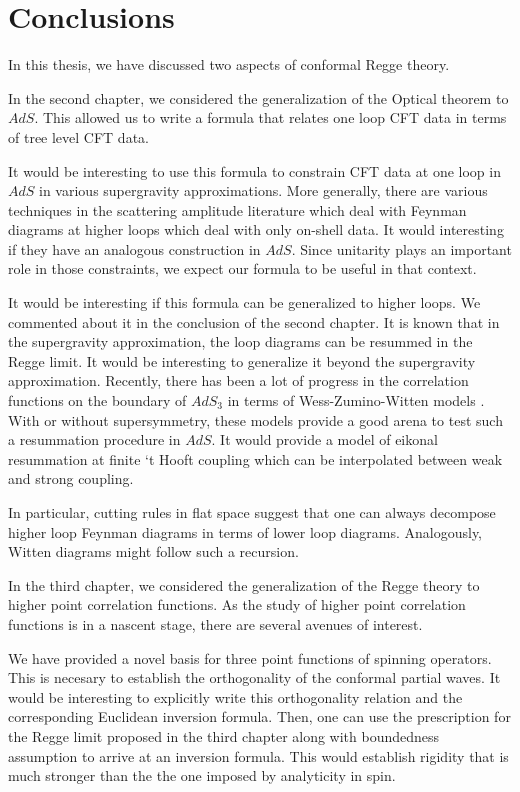 
\chapter{Conclusions} %
\label{part:conclusions}

In this thesis, we have discussed two aspects of conformal Regge theory.

In the second chapter, we considered the generalization of the Optical theorem to $ AdS $.
This allowed us to write a formula that relates one loop CFT data in terms of tree level CFT data.

It would be interesting to use this formula to constrain CFT data at one loop in $ AdS $ in various supergravity approximations.
More generally, there are various techniques in the scattering amplitude literature which deal with Feynman diagrams at higher loops which deal with only on-shell data.
It would interesting if they have an analogous construction in $ AdS $.
Since unitarity plays an important role in those constraints, we expect our formula to be useful in that context.

It would be interesting if this formula can be generalized to higher loops.
We commented about it in the conclusion of the second chapter.
It is known that in the supergravity approximation, the loop diagrams can be resummed in the Regge limit.
It would be interesting to generalize it beyond the supergravity approximation.
Recently, there has been a lot of progress in the correlation functions on the boundary of $ AdS_3 $ in terms of Wess-Zumino-Witten models \cite{Eberhardt:2021vsx}.
With or without supersymmetry, these models provide a good arena to test such a resummation procedure in $ AdS $.
It would provide a model of eikonal resummation at finite `t Hooft coupling which can be interpolated between weak and strong coupling.

In particular, cutting rules in flat space suggest that one can always decompose higher loop Feynman diagrams in terms of lower loop diagrams.
Analogously, Witten diagrams might follow such a recursion.

In the third chapter, we considered the generalization of the Regge theory to higher point correlation functions.
As the study of higher point correlation functions is in a nascent stage, there are several avenues of interest.

We have provided a novel basis for three point functions of spinning operators.
This is necesary to establish the orthogonality of the conformal partial waves.
It would be interesting to explicitly write this orthogonality relation and the corresponding Euclidean inversion formula.
Then, one can use the prescription for the Regge limit proposed in the third chapter along with boundedness assumption to arrive at an inversion formula.
This would establish rigidity that is much stronger than the the one imposed by analyticity in spin.

